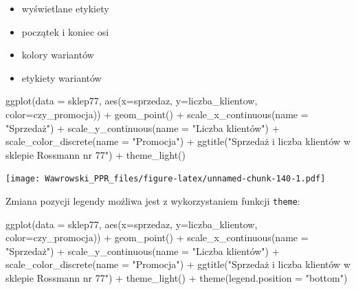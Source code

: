 \documentclass[
]{book}
\newenvironment{Shaded}{\begin{snugshade}}{\end{snugshade}}
\newcommand{\AttributeTok}[1]{\textcolor[rgb]{0.77,0.63,0.00}{#1}}
\newcommand{\FunctionTok}[1]{\textcolor[rgb]{0.00,0.00,0.00}{#1}}
\newcommand{\NormalTok}[1]{#1}
\newcommand{\SpecialCharTok}[1]{\textcolor[rgb]{0.00,0.00,0.00}{#1}}
\newcommand{\StringTok}[1]{\textcolor[rgb]{0.31,0.60,0.02}{#1}}
\providecommand{\tightlist}{%
  \setlength{\itemsep}{0pt}\setlength{\parskip}{0pt}}
\begin{document}
\begin{itemize}
\tightlist
\item
  wyświetlane etykiety
\item
  początek i koniec osi
\item
  kolory wariantów
\item
  etykiety wariantów
\end{itemize}

\begin{Shaded}
\begin{Highlighting}[]
\FunctionTok{ggplot}\NormalTok{(}\AttributeTok{data =}\NormalTok{ sklep77, }\FunctionTok{aes}\NormalTok{(}\AttributeTok{x=}\NormalTok{sprzedaz, }\AttributeTok{y=}\NormalTok{liczba\_klientow, }\AttributeTok{color=}\NormalTok{czy\_promocja)) }\SpecialCharTok{+}
  \FunctionTok{geom\_point}\NormalTok{() }\SpecialCharTok{+}
  \FunctionTok{scale\_x\_continuous}\NormalTok{(}\AttributeTok{name =} \StringTok{"Sprzedaż"}\NormalTok{) }\SpecialCharTok{+}
  \FunctionTok{scale\_y\_continuous}\NormalTok{(}\AttributeTok{name =} \StringTok{"Liczba klientów"}\NormalTok{) }\SpecialCharTok{+}
  \FunctionTok{scale\_color\_discrete}\NormalTok{(}\AttributeTok{name =} \StringTok{"Promocja"}\NormalTok{) }\SpecialCharTok{+}
  \FunctionTok{ggtitle}\NormalTok{(}\StringTok{"Sprzedaż i liczba klientów w sklepie Rossmann nr 77"}\NormalTok{) }\SpecialCharTok{+}
  \FunctionTok{theme\_light}\NormalTok{()}
\end{Highlighting}
\end{Shaded}

\texttt{[image: Wawrowski\_PPR\_files/figure-latex/unnamed-chunk-140-1.pdf]}

Zmiana pozycji legendy możliwa jest z wykorzystaniem funkcji \texttt{theme}:

\begin{Shaded}
\begin{Highlighting}[]
\FunctionTok{ggplot}\NormalTok{(}\AttributeTok{data =}\NormalTok{ sklep77, }\FunctionTok{aes}\NormalTok{(}\AttributeTok{x=}\NormalTok{sprzedaz, }\AttributeTok{y=}\NormalTok{liczba\_klientow, }\AttributeTok{color=}\NormalTok{czy\_promocja)) }\SpecialCharTok{+}
  \FunctionTok{geom\_point}\NormalTok{() }\SpecialCharTok{+}
  \FunctionTok{scale\_x\_continuous}\NormalTok{(}\AttributeTok{name =} \StringTok{"Sprzedaż"}\NormalTok{) }\SpecialCharTok{+}
  \FunctionTok{scale\_y\_continuous}\NormalTok{(}\AttributeTok{name =} \StringTok{"Liczba klientów"}\NormalTok{) }\SpecialCharTok{+}
  \FunctionTok{scale\_color\_discrete}\NormalTok{(}\AttributeTok{name =} \StringTok{"Promocja"}\NormalTok{) }\SpecialCharTok{+}
  \FunctionTok{ggtitle}\NormalTok{(}\StringTok{"Sprzedaż i liczba klientów w sklepie Rossmann nr 77"}\NormalTok{) }\SpecialCharTok{+}
  \FunctionTok{theme\_light}\NormalTok{() }\SpecialCharTok{+}
  \FunctionTok{theme}\NormalTok{(}\AttributeTok{legend.position =} \StringTok{"bottom"}\NormalTok{)}
\end{Highlighting}
\end{Shaded}
\end{document}
